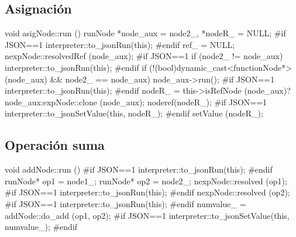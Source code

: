 \subsection{Asignación}
\begin{myverbatim}
void asigNode::run () {
   runNode *node_aux = node2_, *nodeR_ = NULL;
   #if JSON==1
      interpreter::to_jsonRun(this);
   #endif
   ref_ = NULL;
   nexpNode::resolvedRef (node_aux);
   #if JSON==1
      if (node2_ != node_aux)
         interpreter::to_jsonRun(this);
   #endif
   if (!(bool)dynamic_cast<functionNode*>(node_aux) && node2_ == node_aux) {
      node_aux->run();
      #if JSON==1
         interpreter::to_jsonRun(this);
      #endif
   }
   nodeR_ = this->isRefNode (node_aux)?node_aux:expNode::clone (node_aux);
   noderef(nodeR_);
   #if JSON==1
      interpreter::to_jsonSetValue(this, nodeR_);
   #endif
   setValue (nodeR_);
}
\end{myverbatim}

\subsection{Operación suma}
\begin{myverbatim}
void addNode::run () {
   #if JSON==1
      interpreter::to_jsonRun(this);
   #endif         
   runNode* op1 = node1_;
   runNode* op2 = node2_;
   nexpNode::resolved (op1);
   #if JSON==1
      interpreter::to_jsonRun(this);
   #endif      
   nexpNode::resolved (op2);
   #if JSON==1
      interpreter::to_jsonRun(this);
   #endif         
   numvalue_ = addNode::do_add (op1, op2);
   #if JSON==1
      interpreter::to_jsonSetValue(this, numvalue_);
   #endif
}
\end{myverbatim}
